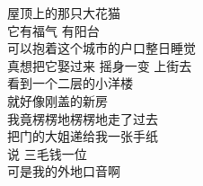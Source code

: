 \begin{songs}{}
	\vspace{2ex}
	屋顶上的那只大花猫	\\
	它有福气 \hspace{5mm} 有阳台	\\
	可以抱着这个城市的户口整日睡觉	\\
	真想把它娶过来 \hspace{5mm} 摇身一变 \hspace{5mm} 上街去	\\
	看到一个二层的小洋楼	\\
	就好像刚盖的新房	\\
	我竟楞楞地楞楞地走了过去	\\
	把门的大姐递给我一张手纸	\\
	说 \hspace{5mm} 三毛钱一位	\\
	可是我的外地口音啊	\\
  \endsong


\end{songs}
